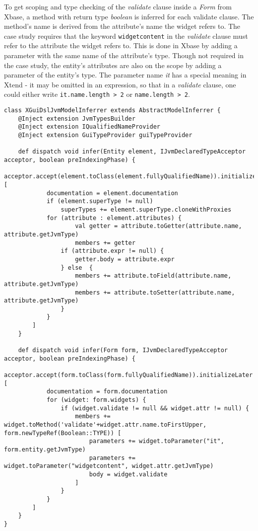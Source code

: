 To get scoping and type checking of the \emph{validate} clause inside a
\emph{Form} from Xbase, a method with return type \emph{boolean} is inferred for
each validate clause. The method's name is derived from the attribute's name the
widget refers to. The case study requires that the keyword \verb|widgetcontent|
in the \emph{validate} clause must refer to the attribute the widget refers to.
This is done in Xbase by adding a parameter with the same name of the
attribute's type. Though not required in the case study, the entity's attributes
are also on the scope by adding a parameter of the entity's type. The parameter
name \emph{it} has a special meaning in Xtend - it may be omitted in an
expression, so that in a \emph{validate} clause, one could either write
\lstinline[basicstyle=\ttfamily]{it.name.length > 2} or \verb|name.length > 2|.


\begin{lstlisting}[language=xtend,float=tb,label=lst:xbase-jvm-inferrer,caption=JvmModelInferrer
written in Xtend.] 
class XGuiDslJvmModelInferrer extends AbstractModelInferrer {
	@Inject extension JvmTypesBuilder
	@Inject extension IQualifiedNameProvider
	@Inject extension GuiTypeProvider guiTypeProvider

	def dispatch void infer(Entity element, IJvmDeclaredTypeAcceptor acceptor, boolean preIndexingPhase) {
		acceptor.accept(element.toClass(element.fullyQualifiedName)).initializeLater [
			documentation = element.documentation
			if (element.superType != null)
				superTypes += element.superType.cloneWithProxies
		    for (attribute : element.attributes) {
					val getter = attribute.toGetter(attribute.name, attribute.getJvmType)
					members += getter
		    	if (attribute.expr != null) {
					getter.body = attribute.expr
		        } else  {
		            members += attribute.toField(attribute.name, attribute.getJvmType)
			        members += attribute.toSetter(attribute.name, attribute.getJvmType)
		        }
		    }
   		]
   	}

	def dispatch void infer(Form form, IJvmDeclaredTypeAcceptor acceptor, boolean preIndexingPhase) { 
		acceptor.accept(form.toClass(form.fullyQualifiedName)).initializeLater [
			documentation = form.documentation 
			for (widget: form.widgets) {
		    	if (widget.validate != null && widget.attr != null) {
		    		members += widget.toMethod('validate'+widget.attr.name.toFirstUpper, form.newTypeRef(Boolean::TYPE)) [
		    			parameters += widget.toParameter("it", form.entity.getJvmType)
		    			parameters += widget.toParameter("widgetcontent", widget.attr.getJvmType)
		    			body = widget.validate
		    		]
		    	}
		    }   		 	
   		]
   	}
}
\end{lstlisting}

